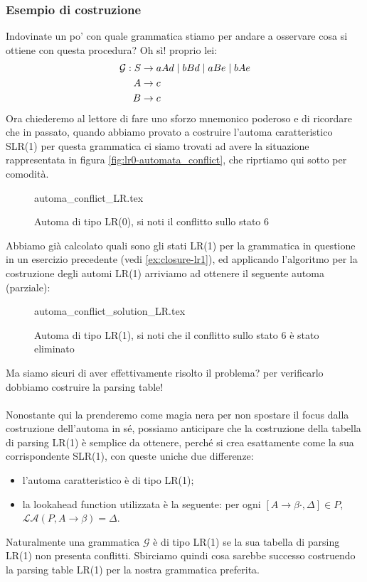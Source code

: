 \documentclass[class=book, crop=false, oneside, 12pt]{standalone}
\begin{document}
\subsubsection{Esempio di costruzione}
Indovinate un po' con quale grammatica stiamo per andare a osservare cosa si ottiene con questa procedura? Oh sì! proprio lei:
\begin{align}
    \label{eq:ex3-slr1-grammarrrrrr-again-and-again}
    \mathcal{G}: S &\to aAd \mid bBd \mid aBe \mid bAe \\
    A &\to c \nonumber \\ \notag
    B &\to c \notag
\end{align}
Ora chiederemo al lettore di fare uno sforzo mnemonico poderoso e di ricordare che in passato, quando abbiamo provato a costruire l'automa caratteristico SLR(1) per questa grammatica ci siamo trovati ad avere la situazione rappresentata in figura \ref{fig:lr0-automata_conflict}, che riprtiamo qui sotto per comodità.
\begin{figure}[H]
    \centering
    {automa_conflict_LR.tex}
    \caption{Automa di tipo LR(0), si noti il conflitto sullo stato 6}
\end{figure}
Abbiamo già calcolato quali sono gli stati LR(1) per la grammatica in questione in un esercizio precedente (vedi \ref{ex:closure-lr1}), ed applicando l'algoritmo per la costruzione degli automi LR(1) arriviamo ad ottenere il seguente automa (parziale):
\begin{figure}[H]
    \centering
    {automa_conflict_solution_LR.tex}
    \caption{Automa di tipo LR(1), si noti che il conflitto sullo stato 6 è stato eliminato}
    \label{fig:lr1-automata_no-conflict}
\end{figure}
Ma siamo sicuri di aver effettivamente risolto il problema? per verificarlo dobbiamo costruire la parsing table!

\paragraph{}
Nonostante qui la prenderemo come magia nera per non spostare il focus dalla costruzione dell'automa in sé, possiamo anticipare che la costruzione della tabella di parsing LR(1) è semplice da ottenere, perché si crea esattamente come la sua corrispondente SLR(1), con queste uniche due differenze:
\begin{itemize}
    \item l'automa caratteristico è di tipo LR(1);
    \item la lookahead function utilizzata è la seguente: per ogni \([A \to \beta \cdot , \Delta] \in P\), \(\mathcal{LA}(P, A \to \beta ) = \Delta\).
\end{itemize}
Naturalmente una grammatica \(\mathcal{G}\) è di tipo LR(1) se la sua tabella di parsing LR(1) non presenta conflitti. Sbirciamo quindi cosa sarebbe successo costruendo la parsing table LR(1) per la nostra grammatica preferita.
\end{document}
